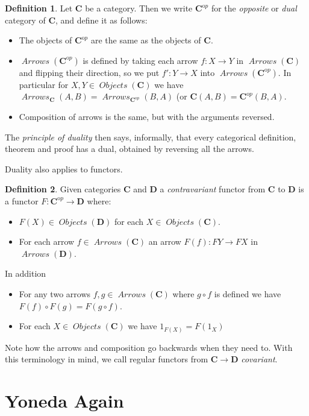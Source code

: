 \documentclass[12pt]{article}
\theoremstyle{definition}
\theoremstyle{definition}
\newtheorem{defn}{Definition}[]
\theoremstyle{definition}
\numberwithin{equation}{section}
\newcommand{\cat}[1]{\mathbf{#1}}      %
\newcommand{\CC}{\cat{C}}
\newcommand{\CCop}{\cat{C}^{\mathrm op}}
\newcommand{\DD}{\cat{D}}
\DeclareMathOperator{\Arrows}{\mathit{Arrows}}
\DeclareMathOperator{\Objects}{\mathit{Objects}}
\def\objc{\Objects(\cat{C})}
\def\ni{\goodbreak\noindent}
\begin{document}
\begin{defn}
Let $\CC$ be a category. Then we write $\CCop$ for the {\it opposite} or {\it dual}
category of $\CC$, and define it as follows:
\begin{itemize}
\item The objects of $\CCop$ are the same as the objects of $\CC$.
\item $\Arrows(\CCop)$ is defined by taking each arrow $f :X \to Y$ in $\Arrows(\CC)$ and
flipping their direction, so we put $f': Y \to X$ into $\Arrows(\CCop)$. In particular for
$X, Y \in \Objects(\CC)$ we have $\Arrows_{\CC}(A, B) = \Arrows_{\CCop}(B, A)$ (or $\CC(A,
B) = \CCop(B, A)$.
\item Composition of arrows is the same, but with the arguments reversed.
\end{itemize}
\end{defn}
\ni
The {\it principle of duality} then says, informally, that every categorical definition,
theorem and proof has a dual, obtained by reversing all the arrows.

Duality also applies to functors.

\begin{defn}
Given categories $\CC$ and $\DD$ a {\it contravariant} functor from $\CC$ to $\DD$ is a
functor $F: \CCop \to \DD$ where:
\begin{itemize}
\item $F(X) \in \Objects(\DD)$ for each $X \in \objc$.
\item For each arrow $f \in \Arrows(\CC)$ an arrow $F(f): FY \to FX$ in $\Arrows(\DD)$.
\end{itemize}
\goodbreak
\ni
In addition
\begin{itemize}
\item For any two arrows $f, g \in \Arrows(\CC)$ where $g \circ f$ is defined we have
$F(f) \circ F(g) = F(g \circ f)$.
\item For each $X \in \Objects(\CC)$ we have $1_{F(X)} = F(1_X)$
\end{itemize}

\end{defn}
\noindent
Note how the arrows and composition go backwards when they need to. With this terminology in mind, we call
regular functors from $\CC \to \DD$ {\it covariant}.

\section{Yoneda Again}
\end{document}
